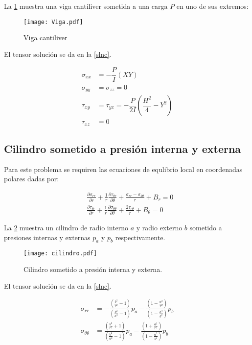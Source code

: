 \documentclass[../notas medios.tex]{subfiles}
\begin{document}
La \cref{Viga} muestra una viga cantiliver sometida a una carga $P$ en uno de sus extremos: 
\begin{figure}[H]
\centering
	\texttt{[image: Viga.pdf]}
	\caption{Viga cantiliver}
	\label{Viga}
\end{figure}

El tensor solución se da en la \cref{slnc}.

\begin{equation}
\begin{split}
{\sigma_{xx}} & = - \dfrac{P}{I} (XY) \\
 {\sigma_{yy} }&= \sigma_{zz} = 0 \\
{\tau_{xy}} & = \tau_{yx} = - \dfrac{P}{2I} (\dfrac{H^2}{4} - Y^2) \\ 
{\tau_{xz}} &= 0
\end{split}	
\label{viga}
\end{equation}


\subsection{Cilindro sometido a presión interna y externa}
Para este problema se requiren las ecuaciones de equlibrio local en coordenadas polares dadas por:

\begin{equation} \label{equcil}
\begin{split}
& \frac{{\partial {\sigma _{rr}}}}{{\partial r}} + \frac{1}{r}\frac{{\partial {\tau _{\theta r}}}}{{\partial \theta }} + \frac{{{\sigma _{rr}} - {\sigma _{\theta \theta }}}}{r} + {B_r} = 0 \\
& \frac{{\partial {\tau _{\theta r}}}}{{\partial r}} + \frac{1}{r}\frac{{\partial {\sigma _{\theta \theta }}}}{{\partial \theta }} + \frac{{2{\tau _{r\theta }}}}{r} + {B_\theta } = 0
\end{split}
\end{equation}

La \cref{cilindro} muestra un cilindro de radio interno $a$ y radio externo $b$ sometido a presiones internas y externas $p_a$ y $p_b$ respectivamente. 

\begin{figure}[H]
\centering
	\texttt{[image: cilindro.pdf]}
	\caption{Cilindro sometido a presión interna y externa.}
	\label{cilindro}
\end{figure}

El tensor solución se da en la \cref{slnc}.

\begin{equation}
\begin{split}
{\sigma _{rr}} & =  - \frac{{\left( {\frac{{{b^2}}}{{{r^2}}} - 1} \right)}}{{\left( {\frac{{{b^2}}}{{{a^2}}} - 1} \right)}}{p_a} - \frac{{\left( {1 - \frac{{{a^2}}}{{{r^2}}}} \right)}}{{\left( {1 - \frac{{{a^2}}}{{{b^2}}}} \right)}}{p_b} \\
{\sigma _{\theta \theta }} & = \frac{{\left( {\frac{{{b^2}}}{{{r^2}}} + 1} \right)}}{{\left( {\frac{{{b^2}}}{{{a^2}}} - 1} \right)}}{p_a} - \frac{{\left( {1 + \frac{{{a^2}}}{{{r^2}}}} \right)}}{{\left( {1 - \frac{{{a^2}}}{{{b^2}}}} \right)}}{p_b}
\end{split}
\label{slnc}
\end{equation}
\end{document}
